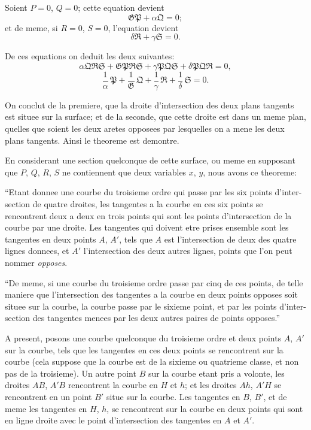 \documentclass[11pt,a4paper]{article}
\begin{document}
Soient $P = 0$, $Q = 0$; cette equation devient
\[\mathfrak{G}\mathfrak{P} + \alpha\mathfrak{Q} = 0;\]
et de meme, si $R = 0$, $S = 0$, l'equation devient
\[\delta\mathfrak{R} + \gamma\mathfrak{S} = 0.\]

De ces equations on deduit les deux suivantes:
\[\alpha\mathfrak{Q}\mathfrak{R}\mathfrak{S} + \mathfrak{G}\mathfrak{P}\mathfrak{R}\mathfrak{S} + \gamma\mathfrak{P}\mathfrak{Q}\mathfrak{S} + \delta\mathfrak{P}\mathfrak{Q}\mathfrak{R} = 0,\]
\[\frac{1}{\alpha}\, \mathfrak{P} + \frac{1}{\mathfrak{G}}\, \mathfrak{Q} + \frac{1}{\gamma}\, \mathfrak{R} + \frac{1}{\delta}\, \mathfrak{S} = 0.\]

On conclut de la premiere, que la droite d'intersection des deux plans tangents est situee
sur la surface; et de la seconde, que cette droite est dans un meme plan, quelles que
soient les deux aretes opposees par lesquelles on a mene les deux plans tangents. Ainsi
le theoreme est demontre.

En considerant une section quelconque de cette surface, ou meme en supposant que
$P$, $Q$, $R$, $S$ ne contiennent que deux variables $x$, $y$, nous avons ce theoreme:

``Etant donnee une courbe du troisieme ordre qui passe par les six points d'inter-
section de quatre droites, les tangentes a la courbe en ces six points se rencontrent deux
a deux en trois points qui sont les points d'intersection de la courbe par une droite.
Les tangentes qui doivent etre prises ensemble sont les tangentes en deux points $A$,
$A'$, tels que $A$ est l'intersection de deux des quatre lignes donnees, et $A'$ l'intersection
des deux autres lignes, points que l'on peut nommer \textit{opposes}.

``De meme, si une courbe du troisieme ordre passe par cinq de ces points, de
telle maniere que l'intersection des tangentes a la courbe en deux points opposes soit
situee sur la courbe, la courbe passe par le sixieme point, et par les points d'inter-
section des tangentes menees par les deux autres paires de points opposes.''

A present, posons une courbe quelconque du troisieme ordre et deux points $A$, $A'$
sur la courbe, tels que les tangentes en ces deux points se rencontrent sur la courbe
(cela suppose que la courbe est de la sixieme ou quatrieme classe, et non pas de la
troisieme). Un autre point $B$ sur la courbe etant pris a volonte, les droites $AB$, $A'B$
rencontrent la courbe en $H$ et $h$; et les droites $Ah$, $A'H$ se rencontrent en un point
$B'$ situe sur la courbe. Les tangentes en $B$, $B'$, et de meme les tangentes en $H$, $h$,
se rencontrent sur la courbe en deux points qui sont en ligne droite avec le point
d'intersection des tangentes en $A$ et $A'$.
\end{document}

